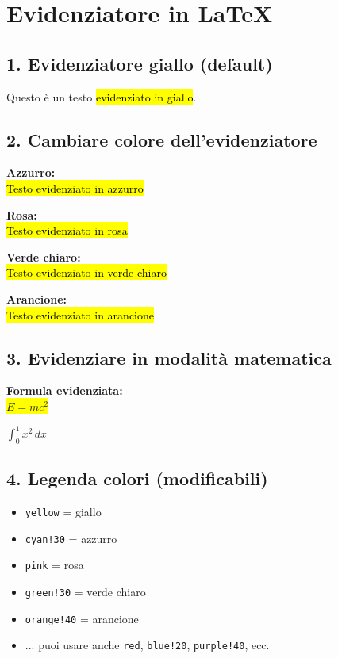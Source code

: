 \section*{Evidenziatore in LaTeX}

\subsection*{1. Evidenziatore giallo (default)}
Questo è un testo \hl{evidenziato in giallo}.

\subsection*{2. Cambiare colore dell'evidenziatore}

\textbf{Azzurro:}\\
{\hl{Testo evidenziato in azzurro}}

\vspace{5pt}
\textbf{Rosa:}\\
{\hl{Testo evidenziato in rosa}}

\vspace{5pt}
\textbf{Verde chiaro:}\\
{\hl{Testo evidenziato in verde chiaro}}

\vspace{5pt}
\textbf{Arancione:}\\
{\hl{Testo evidenziato in arancione}}

\subsection*{3. Evidenziare in modalità matematica}

\textbf{Formula evidenziata:}\\
\colorbox{yellow}{$E = mc^2$}

\vspace{5pt}
\colorbox{cyan!30}{$\int_0^1 x^2\,dx$}

\subsection*{4. Legenda colori (modificabili)}

\begin{itemize}
  \item \texttt{yellow} = giallo
  \item \texttt{cyan!30} = azzurro
  \item \texttt{pink} = rosa
  \item \texttt{green!30} = verde chiaro
  \item \texttt{orange!40} = arancione
  \item ... puoi usare anche \texttt{red}, \texttt{blue!20}, \texttt{purple!40}, ecc.

  
\end{itemize}


